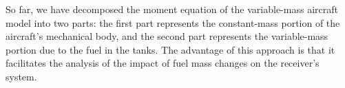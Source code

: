So far, we have decomposed the moment equation of the variable-mass aircraft model into two parts: the first part represents the constant-mass portion of the aircraft's mechanical body, and the second part represents the variable-mass portion due to the fuel in the tanks. The advantage of this approach is that it facilitates the analysis of the impact of fuel mass changes on the receiver's system.

